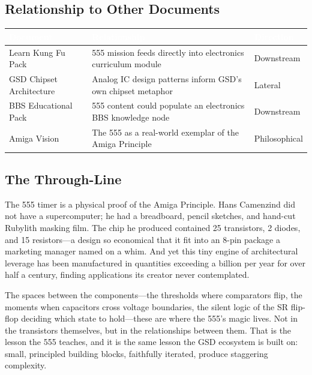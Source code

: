\documentclass[11pt,letterpaper]{article}
\newcommand{\tableheader}[1]{\textbf{\sffamily\textcolor{white}{#1}}}
\begin{document}
\subsection{Relationship to Other Documents}

\begin{center}
\begin{tabularx}{\textwidth}{L{4cm}XC{2.5cm}}
\toprule
{}
\tableheader{Document} & \tableheader{Relationship} & \tableheader{Direction} \\
\midrule
Learn Kung Fu Pack & 555 mission feeds directly into electronics curriculum module & Downstream \\
GSD Chipset Architecture & Analog IC design patterns inform GSD's own chipset metaphor & Lateral \\
BBS Educational Pack & 555 content could populate an electronics BBS knowledge node & Downstream \\
Amiga Vision & The 555 as a real-world exemplar of the Amiga Principle & Philosophical \\
\bottomrule
\end{tabularx}
\end{center}

\subsection{The Through-Line}

The 555 timer is a physical proof of the Amiga Principle. Hans Camenzind did not have a supercomputer; he had a breadboard, pencil sketches, and hand-cut Rubylith masking film. The chip he produced contained 25 transistors, 2 diodes, and 15 resistors---a design so economical that it fit into an 8-pin package a marketing manager named on a whim. And yet this tiny engine of architectural leverage has been manufactured in quantities exceeding a billion per year for over half a century, finding applications its creator never contemplated.

The spaces between the components---the thresholds where comparators flip, the moments when capacitors cross voltage boundaries, the silent logic of the SR flip-flop deciding which state to hold---these are where the 555's magic lives. Not in the transistors themselves, but in the relationships between them. That is the lesson the 555 teaches, and it is the same lesson the GSD ecosystem is built on: small, principled building blocks, faithfully iterated, produce staggering complexity.
\end{document}
